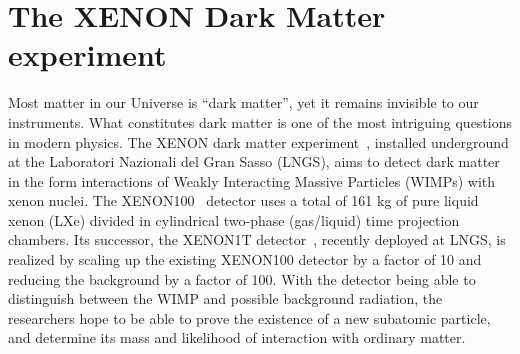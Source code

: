 \documentclass[a4paper]{jpconf}
\begin{document}
\section{The XENON Dark Matter experiment}
Most matter in our Universe is ``dark matter'', yet it remains invisible to our instruments. What
constitutes dark matter is one of the most intriguing questions in modern physics. 
The XENON dark matter experiment~\cite{Aprile2012573},
installed underground at the Laboratori Nazionali del Gran Sasso (LNGS),
aims to detect dark matter in the form interactions of Weakly 
Interacting Massive Particles (WIMPs) with xenon nuclei.
The XENON100~\cite{aprile2014analysis} detector uses a total of 161 kg of 
pure liquid xenon (LXe) divided in cylindrical two-phase  (gas/liquid)  time  projection  chambers.
Its successor, the XENON1T detector~\cite{aprile2013xenon1t}, recently deployed at LNGS, is 
realized by scaling up the existing XENON100 detector by a factor of 10 and reducing the background by a 
factor of 100. With the detector being able to distinguish between the WIMP and possible 
background radiation, the researchers hope to be able to prove the existence of a new subatomic 
particle, and determine its mass and likelihood of interaction with ordinary matter.
\end{document}
